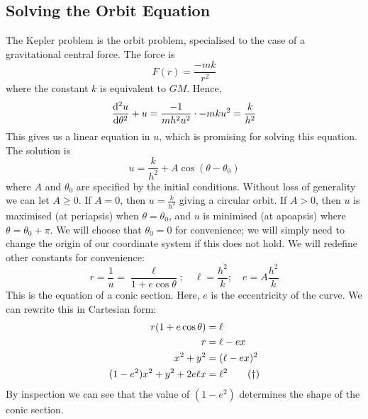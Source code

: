 \subsection{Solving the Orbit Equation}
The Kepler problem is the orbit problem, specialised to the case of a gravitational central force.
The force is
\[
	F(r) = \frac{-mk}{r^2}
\]
where the constant \(k\) is equivalent to \(GM\).
Hence,
\[
	\dv[2]{u}{\theta} + u = \frac{-1}{mh^2u^2} \cdot -mku^2 = \frac{k}{h^2}
\]
This gives us a linear equation in \(u\), which is promising for solving this equation.
The solution is
\[
	u = \frac{k}{h^2} + A\cos(\theta - \theta_0)
\]
where \(A\) and \(\theta_0\) are specified by the initial conditions.
Without loss of generality we can let \(A \geq 0\).
If \(A = 0\), then \(u = \frac{k}{h^2}\) giving a circular orbit.
If \(A > 0\), then \(u\) is maximised (at periapsis) when \(\theta = \theta_0\), and \(u\) is minimised (at apoapsis) where \(\theta = \theta_0 + \pi\).
We will choose that \(\theta_0 = 0\) for convenience; we will simply need to change the origin of our coordinate system if this does not hold.
We will redefine other constants for convenience:
\[
	r = \frac{1}{u} = \frac{\ell}{1 + e\cos \theta};\quad \ell = \frac{h^2}{k};\quad e = A\frac{h^2}{k}
\]
This is the equation of a conic section.
Here, \(e\) is the eccentricity of the curve.
We can rewrite this in Cartesian form:
\begin{align}
	r(1 + e\cos \theta)         & = \ell \notag              \\
	r                           & = \ell - ex \notag         \\
	x^2 + y^2                   & = (\ell - ex)^2 \notag     \\
	(1-e^2)x^2 + y^2 + 2e\ell x & = \ell^2 \tag{\(\dagger\)}
\end{align}
By inspection we can see that the value of \((1-e^2)\) determines the shape of the conic section.
